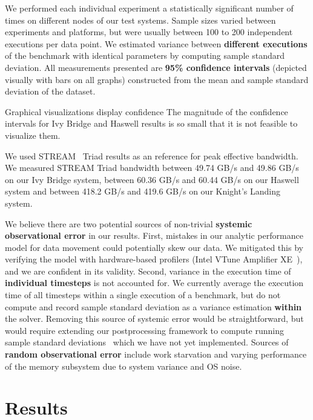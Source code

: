 \documentclass{sig-alternate}
\begin{document}
We performed each individual experiment a statistically significant number of 
  times on different nodes of our test systems.
Sample sizes varied between experiments and platforms, but were usually between
  100 to 200 independent executions per data point.
We estimated variance between \textbf{different
  executions} of the benchmark with identical parameters by computing sample
  standard deviation.
All measurements presented are \textbf{95\% confidence intervals} (depicted
  visually with bars on all graphs) constructed from the mean and sample standard
  deviation of the dataset.
 
Graphical visualizations display confidence 
The magnitude of the confidence intervals for Ivy Bridge and Haswell results is
  so small that it is not feasible to visualize them.~\cite{benchmarking_cxx_code}

We used STREAM~\cite{stream} Triad results as an reference for peak effective
  bandwidth.
We measured STREAM Triad bandwidth between 49.74 GB/s and 49.86 GB/s on our Ivy
  Bridge system, between 60.36 GB/s and 60.44 GB/s on our Haswell system and
  between 418.2 GB/s and 419.6 GB/s on our Knight's Landing system.

We believe there are two potential sources of non-trivial \textbf{systemic
  observational error} in our results.
First, mistakes in our analytic performance model for data movement could
  potentially skew our data.
We mitigated this by verifying the model with hardware-based
  profilers (Intel VTune Amplifier XE~\cite{intel_vtune_amplifier}), and we are
  confident in its validity.
Second, variance in the execution time of \textbf{individual timesteps} is not
  accounted for.
We currently average the execution time of all timesteps
  within a single execution of a benchmark, but do not compute and record
  sample standard deviation as a variance estimation \textbf{within} the solver.
Removing this source of systemic error would be straightforward, but
  would require extending our postprocessing framework to compute running 
  sample standard deviations~\cite{benchmarking_cxx_code} which we have not
  yet implemented.
Sources of \textbf{random observational error} include work starvation and
  varying performance of the memory subsystem due to system variance and OS
  noise.

\section{Results}
\label{sec:results}
\end{document}
